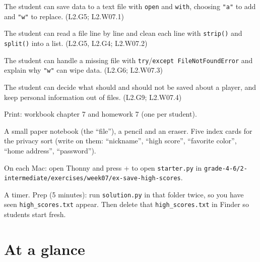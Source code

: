 
\begin{objectives}
  \item The student can save data to a text file with \texttt{open} and \texttt{with}, choosing \texttt{"a"} to add and \texttt{"w"} to replace. (L2.G5; L2.W07.1)
  \item The student can read a file line by line and clean each line with \texttt{strip()} and \texttt{split()} into a list. (L2.G5, L2.G4; L2.W07.2)
  \item The student can handle a missing file with \texttt{try}/\texttt{except FileNotFoundError} and explain why \texttt{"w"} can wipe data. (L2.G6; L2.W07.3)
  \item The student can decide what should and should not be saved about a player, and keep personal information out of files. (L2.G9; L2.W07.4)
\end{objectives}

\begin{materials}
  \item Print: workbook chapter 7 and homework 7 (one per student).
  \item A small paper notebook (the \enquote{file}), a pencil and an eraser. Five index cards for the privacy sort (write on them: \enquote{nickname}, \enquote{high score}, \enquote{favorite color}, \enquote{home address}, \enquote{password}).
  \item On each Mac: open Thonny and press + to open \texttt{starter.py} in \texttt{grade-4-6/2-intermediate/exercises/week07/ex-save-high-scores}.
  \item A timer. Prep (5 minutes): run \texttt{solution.py} in that folder twice, so you have seen \texttt{high\_scores.txt} appear. Then delete that \texttt{high\_scores.txt} in Finder so students start fresh.
\end{materials}

\section{At a glance}
\begin{timeplan}
\end{timeplan}

